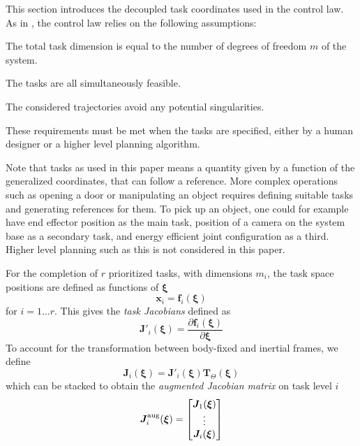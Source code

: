 \documentclass[../main.tex]{subfiles}
\begin{document}
This section introduces the decoupled task coordinates used in the control law. As in \cite{dietrich2020}, the control law relies on the following assumptions:
\begin{assumption}
    The total task dimension is equal to the number of degrees of freedom $m$ of the system.
\end{assumption}
\begin{assumption}
    The tasks are all simultaneously feasible.
\end{assumption}
\begin{assumption}
    The considered trajectories avoid any potential singularities.
\end{assumption}
These requirements must be met when the tasks are specified, either by a human designer or a higher level planning algorithm.
\begin{remark}
    Note that tasks as used in this paper means a quantity given by a function of the generalized coordinates, that can follow a reference. More complex operations such as opening a door or manipulating an object requires defining suitable tasks and generating references for them. To pick up an object, one could for example have end effector position as the main task, position of a camera on the system base as a secondary task, and energy efficient joint configuration as a third. Higher level planning such as this is not considered in this paper.
\end{remark}
For the completion of $r$ prioritized tasks, with dimensions $m_i$, the task space positions are defined as functions of $\bm{\xi}$
\begin{equation}
   \bm{x}_i = \bm{f}_i(\bm{\xi})
\end{equation}
for $i = 1 \dots r$. This gives the \emph{task Jacobians} defined as
\begin{equation}
    \bm{J'}_i(\bm{\xi}) = \frac{\partial \bm{f}_i(\bm{\xi})}{\partial \bm{\xi}}
\end{equation}
To account for the transformation between body-fixed and inertial frames, we define
\begin{equation}
    \bm{J}_i(\bm{\xi}) = \bm{J'}_i(\bm{\xi}) \bm{T}_\Theta(\bm{\xi})
\end{equation}
which can be stacked to obtain the \emph{augmented Jacobian matrix} on task level $i$
\begin{equation}
    \bm{J}_i^{\rm aug}(\bm{\xi}) = \begin{bmatrix}
        \bm{J}_1(\bm{\xi}) \\
        \vdots \\
        \bm{J}_i(\bm{\xi})
    \end{bmatrix}
\end{equation}
\end{document}
